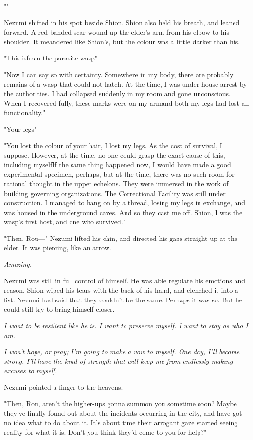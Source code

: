 "\el "

Nezumi shifted in his spot beside Shion. Shion also held his breath, and
leaned forward. A red banded scar wound up the elder's arm from his
elbow to his shoulder. It meandered like Shion's, but the colour was a
little darker than his.

"This is\el from the parasite wasp\el "

"Now I can say so with certainty. Somewhere in my body, there are
probably remains of a wasp that could not hatch. At the time, I was
under house arrest by the authorities. I had collapsed suddenly in my
room and gone unconscious. When I recovered fully, these marks were on
my arm\el and both my legs had lost all functionality."

"Your legs\el "

"You lost the colour of your hair, I lost my legs. As the cost of
survival, I suppose. However, at the time, no one could grasp the exact
cause of this, including myself\el If the same thing happened now, I
would have made a good experimental specimen, perhaps, but at the time,
there was no such room for rational thought in the upper echelons. They
were immersed in the work of building governing organizations. The
Correctional Facility was still under construction. I managed to hang on
by a thread, losing my legs in exchange, and was housed in the
underground caves. And so they cast me off. Shion, I was the wasp's
first host, and one who survived."

"Then, Rou---" Nezumi lifted his chin, and directed his gaze straight up
at the elder. It was piercing, like an arrow.

\emph{Amazing.}

Nezumi was still in full control of himself. He was able regulate his
emotions and reason. Shion wiped his tears with the back of his hand,
and clenched it into a fist. Nezumi had said that they couldn't be the
same. Perhaps it was so. But he could still try to bring himself closer.

\emph{I want to be resilient like he is. I want to preserve myself. I want to
stay as who I am.}

\emph{I won't hope, or pray; I'm going to make a vow to myself. One day, I'll
become strong. I'll have the kind of strength that will keep me from
endlessly making excuses to myself.}

Nezumi pointed a finger to the heavens.

"Then, Rou, aren't the higher-ups gonna summon you sometime soon? Maybe
they've finally found out about the incidents occurring in the city, and
have got no idea what to do about it. It's about time their arrogant
gaze started seeing reality for what it is. Don't you think they'd come
to you for help?"

